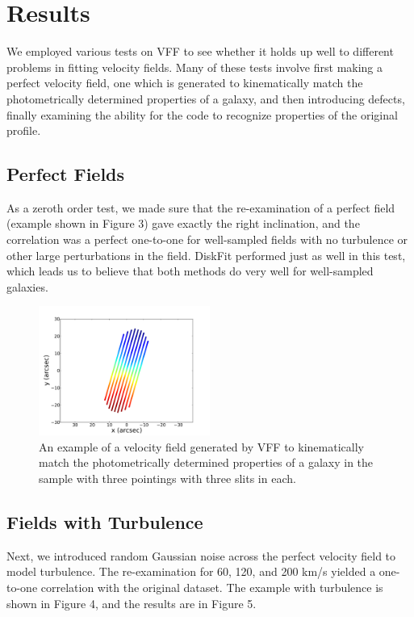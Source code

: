 \documentclass{emulateapj}
\begin{document}
\section{Results}
\large We employed various tests on VFF to see whether it holds up well to different problems in fitting velocity fields. Many of these tests involve first making a perfect velocity field, one which is generated to kinematically match the photometrically determined properties of a galaxy, and then introducing defects, finally examining the ability for the code to recognize properties of the original profile.

\subsection{Perfect Fields}
\large As a zeroth order test, we made sure that the re-examination of a perfect field (example shown in Figure 3) gave exactly the right inclination, and the correlation was a perfect one-to-one for well-sampled fields with no turbulence or other large perturbations in the field. DiskFit performed just as well in this test, which leads us to believe that both methods do very well for well-sampled galaxies.

\begin{figure}[h]
\includegraphics[width=0.5\textwidth]{perfectexamp.pdf}
\caption{An example of a velocity field generated by VFF to kinematically match the photometrically determined properties of a galaxy in the sample with three pointings with three slits in each. \label{fig:test}}
\end{figure}

\subsection{Fields with Turbulence}
\large Next, we introduced random Gaussian noise across the perfect velocity field to model turbulence. The re-examination for 60, 120, and 200 km/s yielded a one-to-one correlation with the original dataset. The example with turbulence is shown in Figure 4, and the results are in Figure 5. 
\end{document}
